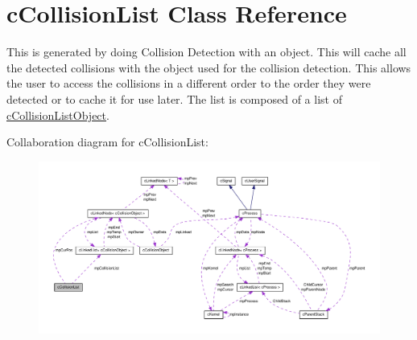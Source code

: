 \hypertarget{classc_collision_list}{
\section{cCollisionList Class Reference}
\label{classc_collision_list}
}


This is generated by doing Collision Detection with an object. This will cache all the detected collisions with the object used for the collision detection. This allows the user to access the collisions in a different order to the order they were detected or to cache it for use later. The list is composed of a list of \hyperlink{classc_collision_list_object}{cCollisionListObject}.  




Collaboration diagram for cCollisionList:\nopagebreak
\begin{figure}[H]
\begin{center}
\leavevmode
\includegraphics[width=400pt]{classc_collision_list__coll__graph}
\end{center}
\end{figure}
